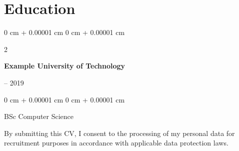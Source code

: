 \documentclass[10pt, letterpaper]{article}
\newenvironment{onecolentry}{
    \begin{adjustwidth}{
        0 cm + 0.00001 cm
    }{
        0 cm + 0.00001 cm
    }
}{
    \end{adjustwidth}
}
\newenvironment{twocolentry}[2][]{
    \onecolentry
    \def\secondColumn{#2}
    \setcolumnwidth{\fill, 4.5 cm}
    \begin{paracol}{2}
}{
    \switchcolumn \raggedleft \secondColumn
    \end{paracol}
    \endonecolentry
}
\begin{document}
\section{Education}
\begin{samepage}
\begin{twocolentry}{2015 -- 2019}
\textbf{Example University of Technology}
\end{twocolentry}
\vspace{0.04 cm}
\begin{onecolentry}
BSc Computer Science
\vspace{0.04 cm}
\end{onecolentry}
\end{samepage}
\vspace{0.08 cm}
\begin{samepage}
By submitting this CV, I consent to the processing of my personal data for recruitment purposes in accordance with applicable data protection laws.
\end{samepage}
\end{document}
